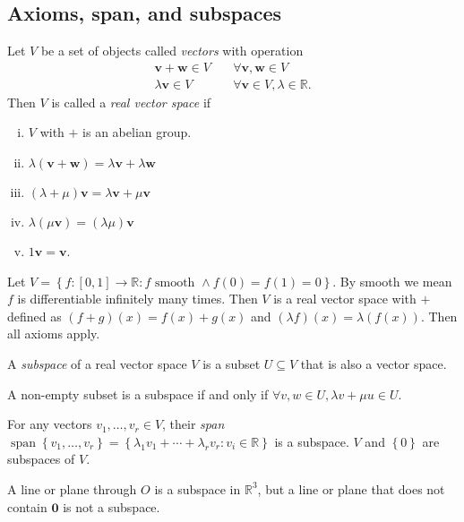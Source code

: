 \documentclass[10pt]{article}
\DeclareMathOperator{\spn}{span}
\begin{document}
    \subsection{Axioms, span, and subspaces}
    \begin{definition}
        Let $V$ be a set of objects called \textit{vectors} with operation
        \[
            \begin{aligned}
                 \mathbf{v}+\mathbf{w}\in V&\quad \forall \mathbf{v},\mathbf{w}\in V\\
                 \lambda \mathbf{v}\in V&\quad \forall \mathbf{v}\in V, \lambda\in \mathbb{R}.
            \end{aligned}
        \]
        Then $V$ is called a \textit{real vector space} if 
        \begin{enumerate}[(i).]
            \item $V$ with $+$ is an abelian group.
            \item $ \lambda(\mathbf{v}+\mathbf{w})=\lambda \mathbf{v}+\lambda \mathbf{w} $
            \item $ (\lambda+\mu)\mathbf{v}=\lambda \mathbf{v}+\mu \mathbf{v} $
            \item $ \lambda(\mu \mathbf{v})=(\lambda \mu) \mathbf{v} $
            \item $ 1 \mathbf{v}=\mathbf{v} $.
        \end{enumerate}
    \end{definition}
    \begin{example}
        Let $ V=\left\{ f:[0,1] \to \mathbb{R} : f\text{ smooth } \land f(0)=f(1)=0\right\} $. By smooth we mean $f$ is differentiable infinitely many times. Then $V$ is a real vector space with $+$ defined as $ (f+g)(x)=f(x)+g(x) $ and $ (\lambda f)(x)=\lambda(f(x)) $. Then all axioms apply.
    \end{example}
    \begin{definition}
        A \textit{subspace} of a real vector space $V$ is a subset $U \subseteq V$ that is also a vector space. 
    \end{definition}
    \begin{remark}
        A non-empty subset is a subspace if and only if $ \forall v,w\in U, \lambda v+ \mu u\in U $.
    \end{remark}
    For any vectors $ v_1,\dots,v_r\in V $, their \textit{span} $ \spn\left\{ v_1,\dots,v_r\right\}=\left\{ \lambda_1 v_1+\cdots+\lambda_r v_r:v_i\in \mathbb{R} \right\} $ is a subspace. $V$ and $ \left\{ 0\right\} $ are subspaces of $V$.
    \begin{example}
        A line or plane through $O$ is a subspace in $ \mathbb{R}^3 $, but a line or plane that does not contain $ \mathbf{0} $ is not a subspace.
    \end{example}
\end{document}
